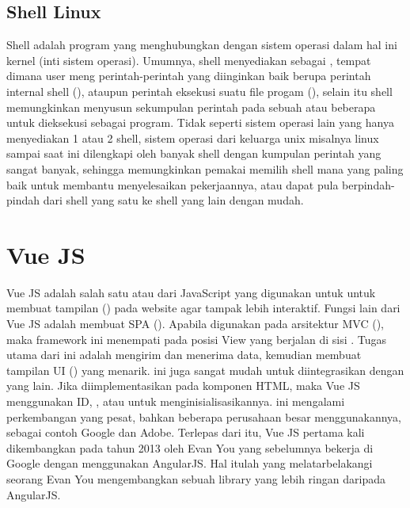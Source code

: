 {{\subsection{Shell Linux}

Shell adalah program yang menghubungkan  dengan sistem operasi dalam hal ini kernel (inti sistem operasi).
Umumnya, shell menyediakan  sebagai , tempat dimana user meng perintah-perintah yang diinginkan baik berupa perintah internal shell (),
ataupun perintah eksekusi suatu file progam (), selain itu shell memungkinkan  menyusun sekumpulan perintah pada sebuah atau beberapa  untuk dieksekusi sebagai program.
Tidak seperti sistem operasi lain yang hanya menyediakan 1 atau 2 shell, sistem operasi dari keluarga unix misalnya linux sampai saat ini dilengkapi oleh banyak shell dengan kumpulan perintah yang sangat banyak, sehingga memungkinkan pemakai memilih shell mana yang paling baik untuk membantu menyelesaikan pekerjaannya, atau dapat pula berpindah-pindah dari shell yang satu ke shell yang lain dengan mudah.

\section{Vue JS}
Vue JS adalah salah satu  atau  dari JavaScript yang digunakan untuk untuk membuat tampilan () pada website agar tampak lebih interaktif.
Fungsi lain dari Vue JS adalah membuat SPA (). Apabila digunakan pada arsitektur MVC (), maka framework ini menempati pada posisi View yang berjalan di sisi .
Tugas utama dari  ini adalah mengirim dan menerima data, kemudian membuat tampilan UI () yang menarik.  ini juga sangat mudah untuk diintegrasikan dengan  yang lain.
Jika diimplementasikan pada komponen HTML, maka Vue JS menggunakan ID, , atau  untuk menginisialisasikannya.
 ini mengalami perkembangan yang pesat, bahkan beberapa perusahaan besar menggunakannya, sebagai contoh Google dan Adobe. Terlepas dari itu, Vue JS pertama kali dikembangkan pada tahun 2013 oleh Evan You yang sebelumnya bekerja di Google dengan menggunakan AngularJS.
Hal itulah yang melatarbelakangi seorang Evan You mengembangkan sebuah library yang lebih ringan daripada AngularJS.

}}
